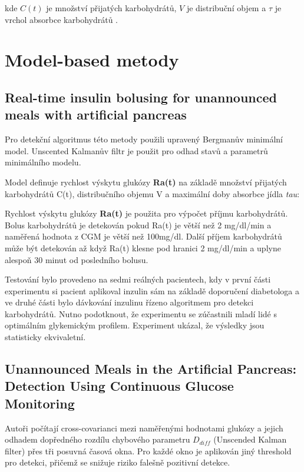 
\noindent kde $C(t)$ je množství přijatých karbohydrátů, $V$  je distribuční objem a $\tau$ je vrchol absorbce karbohydrátů \citep{analyzaCHO.Turksoy}.


\section{Model-based metody}
\subsection{Real-time insulin bolusing for unannounced meals with artificial pancreas}
\label{ch:analyzaCHO:turksoy}

Pro detekční algoritmus této metody použili \citet{analyzaCHO.Turksoy} upravený Bergmanův minimální model. Unscented Kalmanův filtr je použit pro odhad stavů a parametrů minimálního modelu.

Model definuje rychlost výskytu glukózy \textbf{Ra(t)} na základě množství přijatých karbohydrátů C(t), distribučního objemu V a maximální doby absorbce jídla \textit{tau}:


Rychlost výskytu glukózy \textbf{Ra(t)} je použita pro výpočet příjmu karbohydrátů. Bolus karbohydrátů je detekován pokud Ra(t) je větší než 2 mg/dl/min a naměřená hodnota z CGM je větší než 100mg/dl. Další příjem karbohydrátů může být detekován až když Ra(t) klesne pod hranici 2 mg/dl/min a uplyne alespoň 30 minut od posledního bolusu.

Testování bylo provedeno na sedmi reálných pacientech, kdy v první části experimentu si pacient aplikoval inzulin sám na základě doporučení diabetologa a ve druhé části bylo dávkování inzulinu řízeno algoritmem pro detekci karbohydrátů. Nutno podotknout, že experimentu se zúčastnili mladí lidé s optimálním glykemickým profilem. Experiment ukázal, že výsledky jsou statisticky ekvivaletní.


\subsection{Unannounced Meals in the Artificial Pancreas: Detection Using Continuous Glucose Monitoring}
\label{ch:analyzaCHO:CrossCovariance}

Autoři \citet{analyzaCHO.CrossCovariance} počítají cross-covarianci mezi naměřenými hodnotami glukózy a jejich odhadem dopředného rozdílu chybového parametru $D_{diff}$ (Unscended Kalman filter) přes tři posuvná časová okna. Pro každé okno je aplikován jiný threshold pro detekci, přičemž se snižuje riziko falešně pozitivní detekce.

